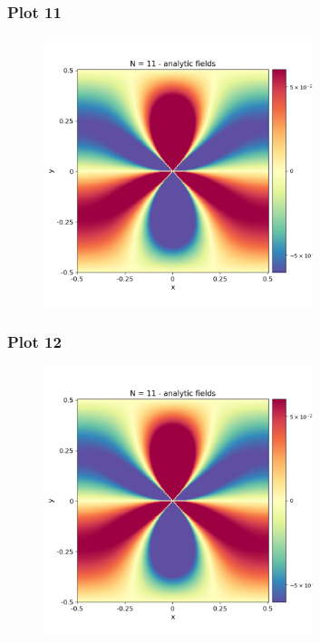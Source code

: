 \documentclass{beamer}
\begin{document}
\begin{frame}
    \frametitle{Plot 11}
    \begin{figure}[H]
        \centering
        \includegraphics[width=0.7\textwidth]{../stress_field_11.png}
    \end{figure}
\end{frame}

\begin{frame}
    \frametitle{Plot 12}
    \begin{figure}[H]
        \centering
        \includegraphics[width=0.7\textwidth]{../stress_field_11.png}
    \end{figure}
\end{frame}

\end{document}
